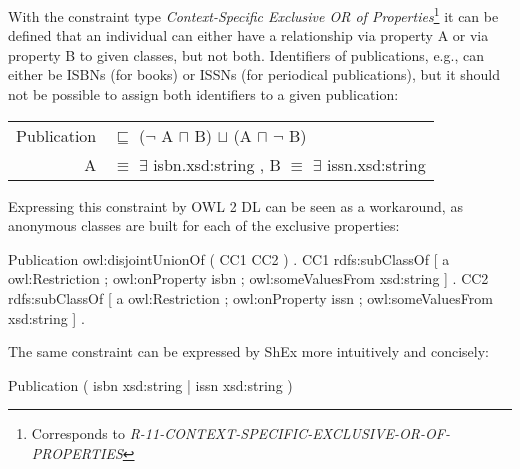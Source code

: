 \documentclass{llncs}
\newcommand{\ms}[1]{\texttt{#1}}
\newenvironment{DL}{
  \vspace{0cm}
  \begin{tabular}{r l}

}{
  \end{tabular}
}
\begin{document}
%
%
%
With the constraint type {\em Context-Specific Exclusive OR of Properties}\footnote{Corresponds to {\em R-11-CONTEXT-SPECIFIC-EXCLUSIVE-OR-OF-PROPERTIES}} 
it can be defined that an individual can either have a relationship via property A or via property B to given classes, but not both.
Identifiers of publications, e.g., can either be ISBNs (for books) or ISSNs (for periodical publications), but it should not be possible to assign both identifiers to a given publication:
\begin{center}
\begin{DL}
Publication &$\sqsubseteq$ ($\neg$ A $\sqcap$ B) $\sqcup$ (A $\sqcap$ $\neg$ B) \\
A &$\equiv$ $\exists$ isbn.xsd:string , B $\equiv$ $\exists$ issn.xsd:string \\ 
\end{DL} 
\end{center}
Expressing this constraint by OWL 2 DL can be seen as a workaround, 
as anonymous classes are built for each of the exclusive properties:
\begin{ex}
Publication owl:disjointUnionOf ( CC1 CC2 ) . 
CC1 rdfs:subClassOf [ a owl:Restriction ;
    owl:onProperty isbn ;
    owl:someValuesFrom xsd:string ] .
CC2 rdfs:subClassOf [ a owl:Restriction ;
    owl:onProperty issn ;
    owl:someValuesFrom xsd:string ] .
\end{ex}
The same constraint can be expressed by ShEx more intuitively and concisely:
\begin{ex}
Publication { (  
    isbn xsd:string | issn xsd:string ) }
\end{ex}
\end{document}
